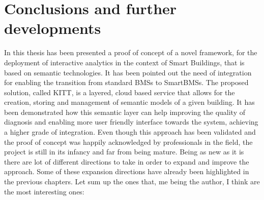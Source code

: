 \chapter{Conclusions and further developments}
In this thesis has been presented a proof of concept of a novel framework, for the deployment of interactive analytics in the context of Smart Buildings, that is based on semantic technologies. It has been pointed out the need of integration for enabling the transition from standard BMSs to SmartBMSs. The proposed solution, called KITT, is a layered, cloud based service that allows for the creation, storing and management of semantic models of a given building. It has been demonstrated how this semantic layer can help improving the quality of diagnosis and enabling more user friendly interface towards the system, achieving a higher grade of integration.
Even though this approach has been validated and the proof of concept was happily acknowledged by professionals in the field, the project is still in its infancy and far from being mature. Being as new as it is there are lot of different directions to take in order to expand and improve the approach. Some of these expansion directions have already been highlighted in the previous chapters. Let sum up the ones that, me being the author, I think are the most interesting ones:
